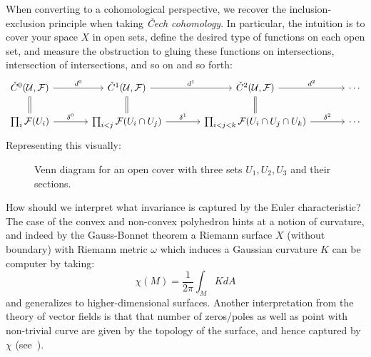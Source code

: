 \documentclass{book}
\newcommand{\CF}{{\mathcal{F}}}
\begin{document}
When converting to a cohomological perspective, we recover the inclusion-exclusion principle when taking
\emph{\v{C}ech cohomology}. In particular, the intuition is to cover your space $X$ in open sets, define the
desired type of functions on each open set, and measure the obstruction to gluing these functions on
intersections, intersection of intersections, and so on and so forth:
\[
\begin{tikzcd}[column sep=large]
\check{C}^0(\mathcal{U}, \CF) \arrow[r, "d^0"] & \check{C}^1(\mathcal{U}, \CF) \arrow[r, "d^1"] & \check{C}^2(\mathcal{U}, \CF) \arrow[r, "d^2"] & \cdots \\
\prod_{i} \CF(U_i) \arrow[u, equal] \arrow[r, "\delta^0"] & \prod_{i<j} \CF(U_i \cap U_j) \arrow[u, equal] \arrow[r, "\delta^1"] & \prod_{i<j<k} \CF(U_i \cap U_j \cap U_k) \arrow[u, equal] \arrow[r, "\delta^2"] & \cdots
\end{tikzcd}
\]
Representing this visually:

\begin{figure}[H]
\centering
{}
\caption{Venn diagram for an open cover with three sets $U_1, U_2, U_3$ and their sections.}
\end{figure}

How should we interpret what invariance is captured by the Euler characteristic? The case of the convex and
non-convex polyhedron hints at a notion of curvature, and indeed by the Gauss-Bonnet theorem a Riemann surface
$X$ (without boundary) with Riemann metric $\omega$ which induces a Gaussian curvature $K$ can be computer by
taking:
\[
  \chi(M) = \frac{1}{2\pi }\int_M K dA
\]
and generalizes to higher-dimensional surfaces. Another interpretation from the theory of vector fields is
that that number of zeros/poles as well as point with non-trivial curve are given by the topology of the
surface, and hence captured by $\chi$ (see~\cite{NateAlgTop}).
\end{document}
